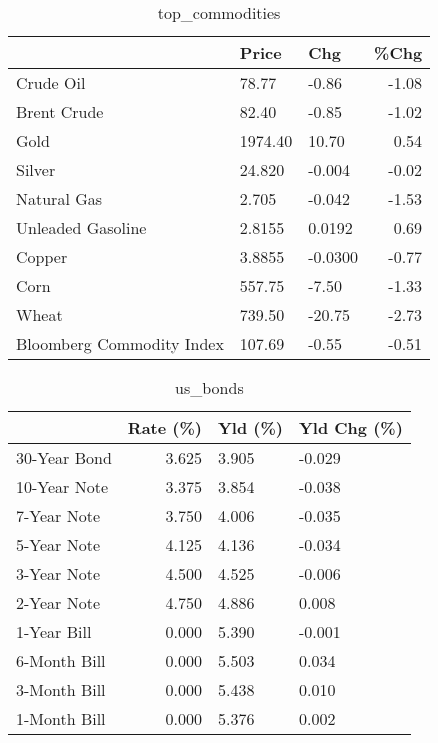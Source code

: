 \documentclass{article}%
\begin{document}
\begin{table}[htbp]%
\caption{top\_commodities}%
\centering%
\begin{adjustbox}{width=1\textwidth}%
\begin{tabular}{lllr}
\toprule
                          &   Price &     Chg &  \%Chg \\
\midrule
               Crude Oil  &   78.77 &   -0.86 & -1.08 \\
             Brent Crude  &   82.40 &   -0.85 & -1.02 \\
                    Gold  & 1974.40 &   10.70 &  0.54 \\
                  Silver  &  24.820 &  -0.004 & -0.02 \\
             Natural Gas  &   2.705 &  -0.042 & -1.53 \\
       Unleaded Gasoline  &  2.8155 &  0.0192 &  0.69 \\
                  Copper  &  3.8855 & -0.0300 & -0.77 \\
                    Corn  &  557.75 &   -7.50 & -1.33 \\
                   Wheat  &  739.50 &  -20.75 & -2.73 \\
Bloomberg Commodity Index &  107.69 &   -0.55 & -0.51 \\
\bottomrule
\end{tabular}
%
\end{adjustbox}%
\end{table}

%


\begin{table}[htbp]%
\caption{us\_bonds}%
\centering%
\begin{adjustbox}{width=1\textwidth}%
\begin{tabular}{lrll}
\toprule
             &  Rate (\%) & Yld (\%) & Yld Chg (\%) \\
\midrule
30-Year Bond &     3.625 &   3.905 &      -0.029 \\
10-Year Note &     3.375 &   3.854 &      -0.038 \\
 7-Year Note &     3.750 &   4.006 &      -0.035 \\
 5-Year Note &     4.125 &   4.136 &      -0.034 \\
 3-Year Note &     4.500 &   4.525 &      -0.006 \\
 2-Year Note &     4.750 &   4.886 &       0.008 \\
 1-Year Bill &     0.000 &   5.390 &      -0.001 \\
6-Month Bill &     0.000 &   5.503 &       0.034 \\
3-Month Bill &     0.000 &   5.438 &       0.010 \\
1-Month Bill &     0.000 &   5.376 &       0.002 \\
\bottomrule
\end{tabular}
%
\end{adjustbox}%
\end{table}
\end{document}
